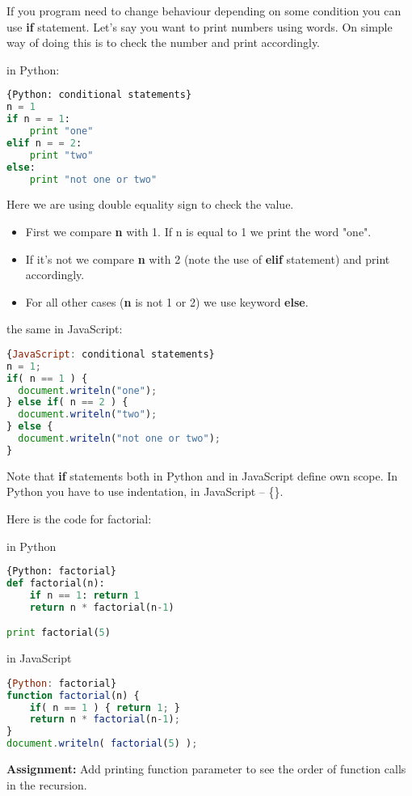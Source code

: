 If you program need to change behaviour depending on some condition
you can use \textbf{if} statement.
Let's say you want to print numbers using words. On simple way of doing
this is to check the number and print accordingly.

in Python:
\begin{lstlisting}[style=codelst,language=Python]{Python: conditional statements}
n = 1
if n = = 1:
    print "one"
elif n = = 2:
    print "two"
else:
    print "not one or two"
\end{lstlisting}
Here we are using double equality sign to check the value.
\begin{itemize}
\item First we compare \textbf{n} with 1.
If n is equal to 1 we print the word "one".
\item If it's not we compare \textbf{n} with 2 (note the use of \textbf{elif} statement)
and print accordingly.
\item For all other cases (\textbf{n} is not 1 or 2) we use keyword \textbf{else}.
\end{itemize}

the same in JavaScript:
\begin{lstlisting}[style=codelst,language=JavaScript]{JavaScript: conditional statements}
n = 1;
if( n == 1 ) {
  document.writeln("one");
} else if( n == 2 ) {
  document.writeln("two");
} else {
  document.writeln("not one or two");
}
\end{lstlisting}

Note that \textbf{if} statements both in Python and in JavaScript
define own scope. In Python you have to use indentation,
in JavaScript -- \{\}.

Here is the code for factorial:

in Python
\begin{lstlisting}[style=codelst,language=Python]{Python: factorial}
def factorial(n):
    if n == 1: return 1
    return n * factorial(n-1)

print factorial(5)
\end{lstlisting}

in JavaScript
\begin{lstlisting}[style=codelst,language=JavaScript]{Python: factorial}
function factorial(n) {
    if( n == 1 ) { return 1; }
    return n * factorial(n-1);
}
document.writeln( factorial(5) );
\end{lstlisting}

\bigskip
\begin{tcolorbox}
\textbf{Assignment:} Add printing function parameter to see the order of function calls
in the recursion.
\end{tcolorbox}

